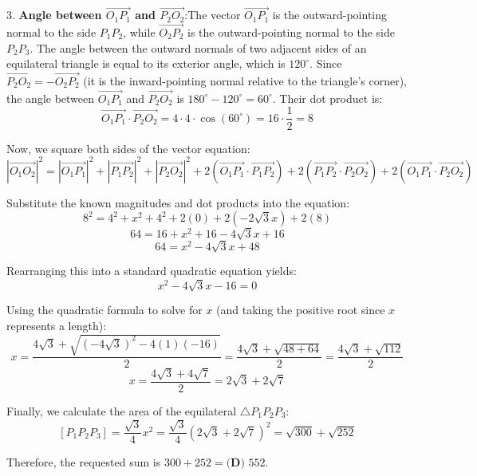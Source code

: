 \begin{enumerate}
 3. \textbf{Angle between $\vec{O_1P_1}$ and $\vec{P_2O_2}$}:The vector $\vec{O_1P_1}$ is the outward-pointing normal to the side $P_1P_2$, while $\vec{O_2P_2}$ is the outward-pointing normal to the side $P_2P_3$. The angle between the outward normals of two adjacent sides of an equilateral triangle is equal to its exterior angle, which is $120^\circ$. Since $\vec{P_2O_2} = -\vec{O_2P_2}$ (it is the inward-pointing normal relative to the triangle's corner), the angle between $\vec{O_1P_1}$ and $\vec{P_2O_2}$ is $180^\circ - 120^\circ = 60^\circ$. Their dot product is:
 \[\vec{O_1P_1} \cdot \vec{P_2O_2} = 4 \cdot 4 \cdot \cos(60^\circ) = 16 \cdot \frac{1}{2} = 8\]

 Now, we square both sides of the vector equation:
 \[|\vec{O_1O_2}|^2 = |\vec{O_1P_1}|^2 + |\vec{P_1P_2}|^2 + |\vec{P_2O_2}|^2 + 2(\vec{O_1P_1} \cdot \vec{P_1P_2}) + 2(\vec{P_1P_2} \cdot \vec{P_2O_2}) + 2(\vec{O_1P_1} \cdot \vec{P_2O_2})\]

 Substitute the known magnitudes and dot products into the equation:
 \[8^2 = 4^2 + x^2 + 4^2 + 2(0) + 2(-2\sqrt{3}x) + 2(8)\]
 \[64 = 16 + x^2 + 16 - 4\sqrt{3}x + 16\]
 \[64 = x^2 - 4\sqrt{3}x + 48\]

 Rearranging this into a standard quadratic equation yields:
 \[x^2 - 4\sqrt{3}x - 16 = 0\]

 Using the quadratic formula to solve for $x$ (and taking the positive root since $x$ represents a length):
 \[x = \frac{4\sqrt{3} + \sqrt{(-4\sqrt{3})^2 - 4(1)(-16)}}{2} = \frac{4\sqrt{3} + \sqrt{48 + 64}}{2} = \frac{4\sqrt{3} + \sqrt{112}}{2}\]
 \[x = \frac{4\sqrt{3} + 4\sqrt{7}}{2} = 2\sqrt{3} + 2\sqrt{7}\]

 Finally, we calculate the area of the equilateral $\triangle P_1P_2P_3$:
 \[[P_1P_2P_3] = \frac{\sqrt{3}}{4} x^2 = \frac{\sqrt{3}}{4} (2\sqrt{3} + 2\sqrt{7})^2 = \sqrt{300} + \sqrt{252}\]

 Therefore, the requested sum is $300 + 252 = \boxed{\textbf{(D) } 552}$.

 


\end{enumerate}